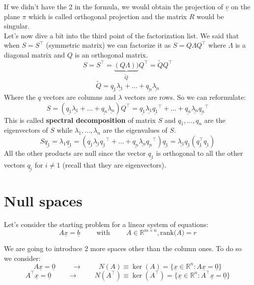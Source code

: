 If we didn't have the 2 in the formula, we would obtain the projection of $\underline{v}$ on the plane $\pi$ which is called orthogonal projection and the matrix $R$ would be singular. \\

Let's now dive a bit into the third point of the factorization list. We said that when $S = S^\intercal$ (symmetric matrix) we can factorize it as $S = Q\Lambda Q^\intercal$ where $\Lambda$ is a diagonal matrix and $Q$ is an orthogonal matrix.\\
\[
S = S^\intercal = \underbrace{(Q\Lambda))}_{\tilde{Q}}Q^\intercal = \tilde{Q}Q^\intercal   
\]
\[
\tilde{Q} = \underline{q_1}\underline{\lambda_1} + \dots + \underline{q_n}\underline{\lambda_n}    
\]
Where the $q$ vectors are columns and $\lambda$ vectors are rows.
So we can reformulate:
\[
    S = (\underline{q_1}\underline{\lambda_1} + \dots + \underline{q_n}\underline{\lambda_n})Q^\intercal = \underline{q_1}\underline{\lambda_1}\underline{q_1}^\intercal + \dots + \underline{q_n}\underline{\lambda_n}\underline{q_n}^\intercal
\]
This is called \textbf{spectral decomposition} of matrix $S$ and $q_1, \dots, q_n$ are the eigenvectors of $S$ while $\lambda_1, \dots, \lambda_n$ are the eigenvalues of $S$.
\[
    S\underline{q_1} = \lambda_1\underline{q_1} = (\underline{q_1}\underline{\lambda_1}\underline{q_1}^\intercal + \dots + \underline{q_n}\underline{\lambda_n}\underline{q_n}^\intercal)\underline{q_1} = 
    \underline{\lambda_1}\underline{q_1}(\underline{q_1^\intercal}\underline{q_1})
    \]
All the other products are null since the vector $\underline{q_1}$ is orthogonal to all the other vectors $\underline{q_i}$ for $i \neq 1$ (recall that they are eigenvectors).

\section{Null spaces}
Let's consider the starting problem for a linear system of equations:
\[
A\underline{x} = \underline{b} \hspace{1cm} \text{with} \hspace{1cm} A\in \mathbb{R}^{m \times n}, \text{rank($A$)}=r    
\]

We are going to introduce 2 more spaces other than the column ones. To do so we consider:
\[
  A\underline{x} = \underline{0} \hspace{1cm} \rightarrow \hspace{1cm} N(A) \equiv \ker(A) = \{\underline{x} \in \mathbb{R}^n : A\underline{x} = \underline{0}\}  
\]
\[
    A^\intercal\underline{x} = \underline{0} \hspace{1cm} \rightarrow \hspace{1cm} N(A^\intercal) \equiv \ker(A^\intercal) = \{\underline{x} \in \mathbb{R}^n : A^\intercal\underline{x} = \underline{0}\}    
\]

